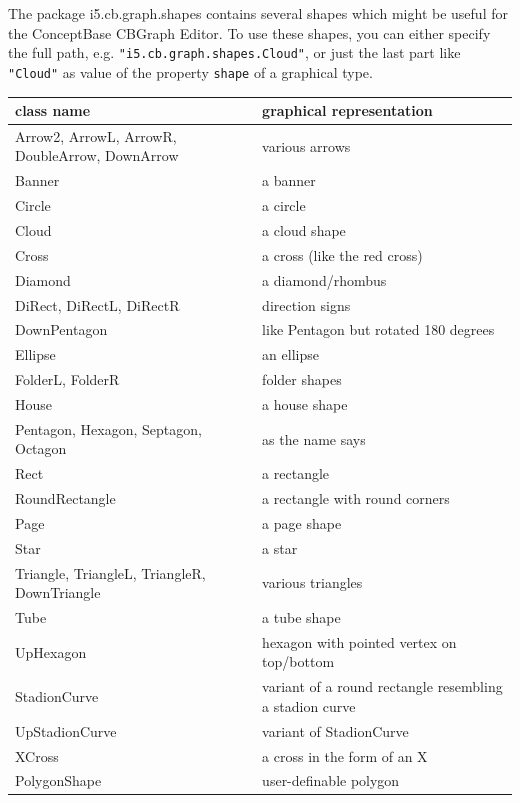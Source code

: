 The package i5.cb.graph.shapes contains several shapes which might
be useful for the ConceptBase CBGraph Editor. To use these shapes, you
can either specify the full path, e.g. {\tt "i5.cb.graph.shapes.Cloud"},
or just the last part like {\tt "Cloud"} as value
of the property {\tt shape} of a graphical type.
\vspace{0.2cm}

\begin{tabular}{|p{4cm}|p{8
cm}|}
\hline
{\bf class name} & {\bf graphical representation} \\ \hline \hline
Arrow2, ArrowL, ArrowR, DoubleArrow, DownArrow & various arrows \\ \hline
Banner & a banner \\ \hline
Circle & a circle  \\ \hline
Cloud & a cloud shape  \\ \hline
Cross & a cross (like the red cross) \\ \hline
Diamond & a diamond/rhombus \\ \hline
DiRect, DiRectL, DiRectR & direction signs  \\ \hline
DownPentagon & like Pentagon but rotated 180 degrees \\ \hline
Ellipse & an ellipse \\ \hline
FolderL, FolderR & folder shapes \\ \hline
House & a house shape \\ \hline
Pentagon, Hexagon, Septagon, Octagon & as the name says \\ \hline
Rect & a rectangle \\ \hline
RoundRectangle & a rectangle with round corners \\ \hline
Page & a page shape \\ \hline
Star & a star \\ \hline
Triangle, TriangleL, TriangleR,  DownTriangle & various triangles\\ \hline
Tube & a tube shape \\ \hline
UpHexagon & hexagon with pointed vertex on top/bottom \\ \hline
StadionCurve & variant of a round rectangle resembling a stadion curve \\ \hline
UpStadionCurve & variant of StadionCurve \\ \hline
XCross & a cross in the form of an X \\ \hline
PolygonShape & user-definable polygon  \\ \hline
\end{tabular}

